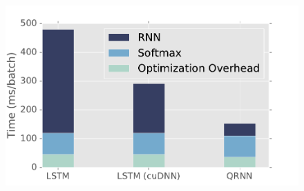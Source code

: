 \documentclass{article} %
\begin{document}
\begin{figure}

    \begin{minipage}{0.5\textwidth}
        \centering
        \includegraphics[width=.99\linewidth]{lstm_qrnn_speed_squish.pdf}
    \end{minipage}%
    \begin{minipage}{0.5\textwidth}
        \centering
        \small

        

\end{minipage}
\end{figure}
\end{document}
